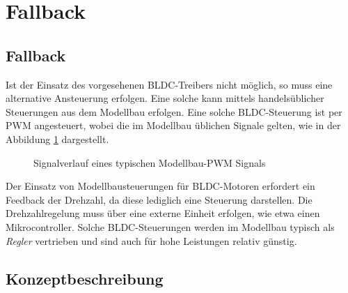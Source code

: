 \ifSTANDALONE
\section{Fallback}
\fi
\ifEMBED
\subsection{Fallback}
\fi
Ist der Einsatz des vorgesehenen BLDC-Treibers nicht möglich, so muss eine
alternative Ansteuerung erfolgen. Eine solche kann mittels handelsüblicher
Steuerungen aus dem Modellbau erfolgen. Eine solche BLDC-Steuerung ist per
PWM angesteuert, wobei die im Modellbau üblichen Signale gelten, wie in der
Abbildung \ref{fig:rc-pwm} dargestellt.

\ifSTANDALONE
\begin{figure}[h!]
	\centering
	\caption{Signalverlauf eines typischen Modellbau-PWM Signals}
	\label{fig:rc-pwm}
\end{figure}
\fi

Der Einsatz von Modellbausteuerungen für BLDC-Motoren erfordert ein
Feedback der Drehzahl, da diese lediglich eine Steuerung darstellen. Die
Drehzahlregelung muss über eine externe Einheit erfolgen, wie etwa einen
Mikrocontroller. Solche BLDC-Steuerungen werden im Modellbau typisch als
\emph{Regler} vertrieben und sind auch für hohe Leistungen relativ günstig.

\ifSTANDALONE
\subsection{Konzeptbeschreibung}
\fi
\ifEMBED

